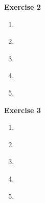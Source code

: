 \documentclass{article}
\begin{document}
\textbf{Exercise 2}\vspace{.25cm}

\begin{enumerate}[label=\alph*)]
\item ~\\\vspace{5cm}
\item ~\\\vspace{5cm}
\item ~\\\vspace{5cm}
\item ~\\\vspace{5cm}
\item ~\\\vspace{5cm}
\end{enumerate}

\textbf{Exercise 3}\vspace{.25cm}

\begin{enumerate}[label=\alph*)]
\item ~\\\vspace{5cm}
\item ~\\\vspace{5cm}
\item ~\\\vspace{5cm}
\item ~\\\vspace{5cm}
\item ~\\\vspace{5cm}
\end{enumerate}
\end{document}
